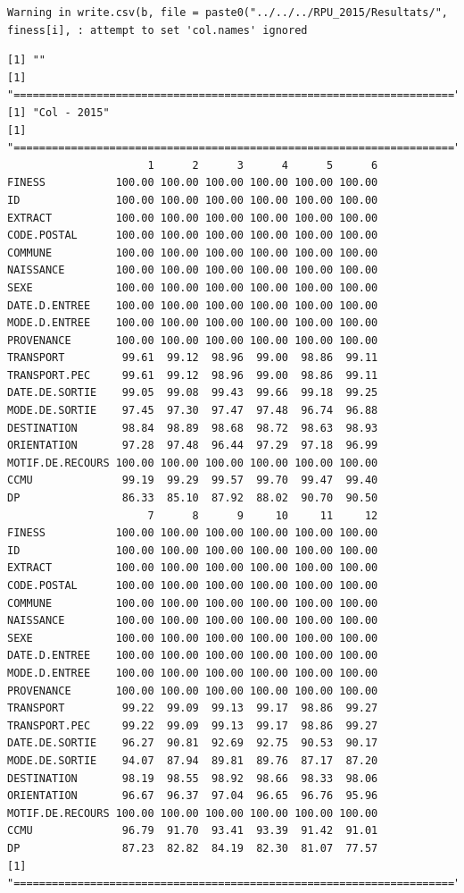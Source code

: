 \documentclass[]{article}
\begin{document}
\begin{verbatim}
Warning in write.csv(b, file = paste0("../../../RPU_2015/Resultats/",
finess[i], : attempt to set 'col.names' ignored
\end{verbatim}

\begin{verbatim}
[1] ""
[1] "====================================================================="
[1] "Col - 2015"
[1] "====================================================================="
                      1      2      3      4      5      6
FINESS           100.00 100.00 100.00 100.00 100.00 100.00
ID               100.00 100.00 100.00 100.00 100.00 100.00
EXTRACT          100.00 100.00 100.00 100.00 100.00 100.00
CODE.POSTAL      100.00 100.00 100.00 100.00 100.00 100.00
COMMUNE          100.00 100.00 100.00 100.00 100.00 100.00
NAISSANCE        100.00 100.00 100.00 100.00 100.00 100.00
SEXE             100.00 100.00 100.00 100.00 100.00 100.00
DATE.D.ENTREE    100.00 100.00 100.00 100.00 100.00 100.00
MODE.D.ENTREE    100.00 100.00 100.00 100.00 100.00 100.00
PROVENANCE       100.00 100.00 100.00 100.00 100.00 100.00
TRANSPORT         99.61  99.12  98.96  99.00  98.86  99.11
TRANSPORT.PEC     99.61  99.12  98.96  99.00  98.86  99.11
DATE.DE.SORTIE    99.05  99.08  99.43  99.66  99.18  99.25
MODE.DE.SORTIE    97.45  97.30  97.47  97.48  96.74  96.88
DESTINATION       98.84  98.89  98.68  98.72  98.63  98.93
ORIENTATION       97.28  97.48  96.44  97.29  97.18  96.99
MOTIF.DE.RECOURS 100.00 100.00 100.00 100.00 100.00 100.00
CCMU              99.19  99.29  99.57  99.70  99.47  99.40
DP                86.33  85.10  87.92  88.02  90.70  90.50
                      7      8      9     10     11     12
FINESS           100.00 100.00 100.00 100.00 100.00 100.00
ID               100.00 100.00 100.00 100.00 100.00 100.00
EXTRACT          100.00 100.00 100.00 100.00 100.00 100.00
CODE.POSTAL      100.00 100.00 100.00 100.00 100.00 100.00
COMMUNE          100.00 100.00 100.00 100.00 100.00 100.00
NAISSANCE        100.00 100.00 100.00 100.00 100.00 100.00
SEXE             100.00 100.00 100.00 100.00 100.00 100.00
DATE.D.ENTREE    100.00 100.00 100.00 100.00 100.00 100.00
MODE.D.ENTREE    100.00 100.00 100.00 100.00 100.00 100.00
PROVENANCE       100.00 100.00 100.00 100.00 100.00 100.00
TRANSPORT         99.22  99.09  99.13  99.17  98.86  99.27
TRANSPORT.PEC     99.22  99.09  99.13  99.17  98.86  99.27
DATE.DE.SORTIE    96.27  90.81  92.69  92.75  90.53  90.17
MODE.DE.SORTIE    94.07  87.94  89.81  89.76  87.17  87.20
DESTINATION       98.19  98.55  98.92  98.66  98.33  98.06
ORIENTATION       96.67  96.37  97.04  96.65  96.76  95.96
MOTIF.DE.RECOURS 100.00 100.00 100.00 100.00 100.00 100.00
CCMU              96.79  91.70  93.41  93.39  91.42  91.01
DP                87.23  82.82  84.19  82.30  81.07  77.57
[1] "====================================================================="
\end{verbatim}
\end{document}
